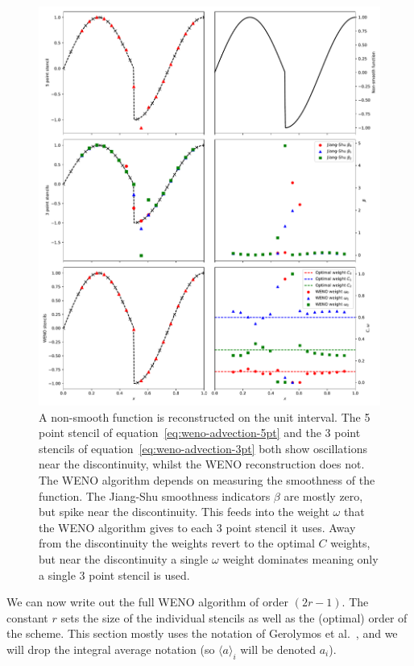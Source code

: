 \begin{figure}
  \includegraphics[width=0.96\linewidth]{weno-weights}
  \caption[WENO reconstruction and weights]{A non-smooth function is reconstructed on the unit interval. The 5 point stencil of equation~\eqref{eq:weno-advection-5pt} and the 3 point stencils of equation~\eqref{eq:weno-advection-3pt} both show oscillations near the discontinuity, whilst the WENO reconstruction does not. The WENO algorithm depends on measuring the smoothness of the function. The Jiang-Shu smoothness indicators $\beta$ are mostly zero, but spike near the discontinuity. This feeds into the weight $\omega$ that the WENO algorithm gives to each 3 point stencil it uses. Away from the discontinuity the weights revert to the optimal $C$ weights, but near the discontinuity a single $\omega$ weight dominates meaning only a single 3 point stencil is used.}
  \label{fig:weno-weights}
\end{figure}

We can now write out the full WENO algorithm of order $(2 r - 1)$. The constant
$r$ sets the size of the individual stencils as well as the (optimal) order of
the scheme. This section mostly uses the notation of Gerolymos et al.~\cite{Gerolymos2009}, and we will drop the integral average notation (so $\langle a \rangle_i$ will be denoted $a_i$).

